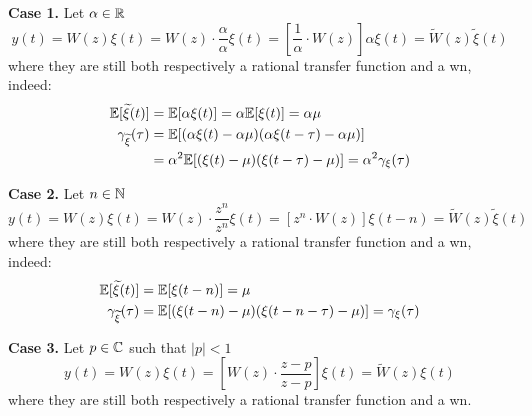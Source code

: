\textbf{Case 1.}
Let $\alpha \in \mathbb{R}$
\[
	y(t)=W(z) \xi(t)=W(z) \cdot \frac{\alpha}{\alpha} \xi(t)=\left[\frac{1}{\alpha} \cdot W(z)\right] \alpha \xi(t)=\tilde{W}(z) \tilde{\xi}(t)
\]
where they are still both respectively a rational transfer function and a \gls{wn}, indeed:
\begin{align*}
	\mathbb{E}[\widetilde{\xi}(t)]&=\mathbb{E}[\alpha \xi(t)]=\alpha \mathbb{E}[\xi(t)]=\alpha \mu\\
	\gamma_{\widetilde{\xi}}(\tau)&=\mathbb{E}[(\alpha\xi(t)-\alpha\mu)(\alpha \xi(t-\tau)-\alpha \mu)]\\
	&=\alpha^2 \mathbb{E}[(\xi(t)-\mu)( \xi(t-\tau)- \mu)] = \alpha^2 \gamma_{\xi}(\tau)
\end{align*}

\textbf{Case 2.}
Let $n \in \mathbb{N}$
\[
	y(t)=W(z) \xi(t)=W(z) \cdot \frac{z^{n}}{z^{n}} \xi(t)=\left[z^{n} \cdot W(z)\right] \xi(t-n)=\tilde{W}(z) \tilde{\xi}(t)
\]
where they are still both respectively a rational transfer function and a \gls{wn}, indeed:
\begin{align*}
	\mathbb{E}[\widetilde{\xi}(t)]&=\mathbb{E}[\xi(t-n)]=\mu \\
	\gamma_{\widetilde{\xi}}(\tau)&=\mathbb{E}[(\xi(t-n)-\mu)(\xi(t-n-\tau)-\mu)]=\gamma_{\xi}(\tau)
\end{align*}

\textbf{Case 3.}
Let $p \in \mathbb{C}$ such that $|p|<1$
\[
	y(t)=W(z) \xi(t)=\left[W(z) \cdot \frac{z-p}{z-p}\right] \xi(t)=\tilde{W}(z) \xi(t)
\]
where they are still both respectively a rational transfer function and a \gls{wn}.

